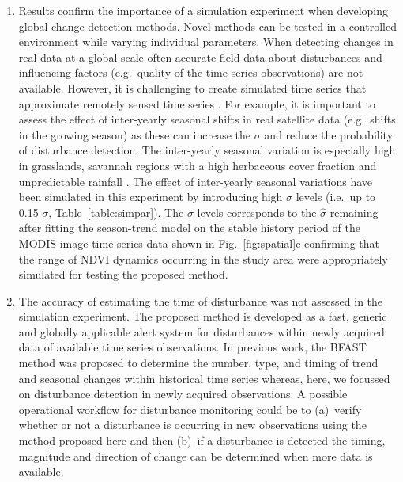 \documentclass[authoryear,preprint,review,10pt]{elsarticle}
\begin{document}
\begin{enumerate}[(1)]
\item Results confirm the importance of a simulation experiment when developing global change detection methods. Novel methods can be tested in a controlled environment while varying individual parameters. When detecting changes in real data at a global scale often accurate field data about disturbances and influencing factors (e.g.\ quality of the time series observations) are not available. However, it is challenging to create simulated time series that approximate remotely sensed time series \citep{Zhang2009}. For example, it is important to assess the effect of inter-yearly seasonal shifts in real satellite data (e.g.\ shifts in the growing season) as these can increase the $\sigma$ and reduce the probability of disturbance detection. The inter-yearly seasonal variation is especially high in grasslands, savannah regions with a high herbaceous cover fraction and unpredictable rainfall \citep{deJong:wo}. The effect of inter-yearly seasonal variations have been simulated in this experiment by introducing high $\sigma$ levels (i.e.\ up to 0.15 $\sigma$, Table~\ref{table:simpar}). The $\sigma$ levels corresponds to the $\hat\sigma$ remaining after fitting the season-trend model on the stable history period of the MODIS image time series data shown in Fig.~\ref{fig:spatial}c confirming that the range of NDVI dynamics occurring in the study area were appropriately simulated for testing the proposed method.

\item The accuracy of estimating the time of disturbance was not assessed in the simulation experiment. The proposed method is developed as a fast, generic and globally applicable alert system for disturbances within newly acquired data of available time series observations. In previous work, the BFAST method was proposed to determine the number, type, and timing of trend and seasonal changes within historical time series \citep{Verbesselt2009a} whereas, here, we focussed on disturbance detection in newly acquired observations. A possible operational workflow for disturbance monitoring could be to (a)~verify whether or not a disturbance is occurring in new observations using the method proposed here and then (b)~if a disturbance is detected the timing, magnitude and direction of change can be determined when more data is available.  


\end{enumerate}
\end{document}

